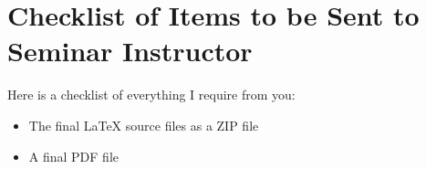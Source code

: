 \documentclass[runningheads,a4paper]{llncs}
\begin{document}
\section*{Checklist of Items to be Sent to Seminar Instructor}
Here is a checklist of everything I require from you:


\begin{itemize}
\settowidth{\leftmargin}{{\Large$\square$}}\advance\leftmargin{}
\itemsep8pt\relax
\renewcommand\labelitemi{{\lower1.5pt\hbox{\Large$\square$}}}

\item The final \LaTeX{} source files as a ZIP file
\item A final PDF file

\end{itemize}
\end{document}
